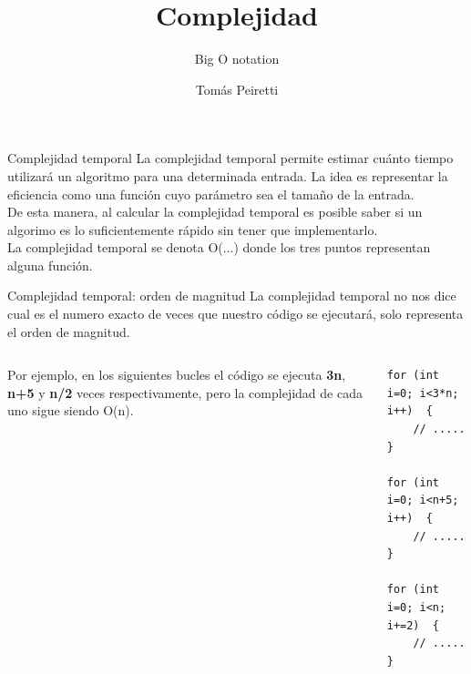 \documentclass[12pt]{beamer}
\title{Complejidad}
\subtitle{Big O notation}
\author{Tomás Peiretti}
\date{}
\begin{document}
\maketitle

\begin{frame}{Complejidad temporal}
    La \alert{complejidad temporal} permite estimar cuánto tiempo utilizará un algoritmo para una determinada entrada. La idea es representar la \alert{eficiencia} como una función cuyo parámetro sea el tamaño de la entrada. \\
    \medskip
    De esta manera, al calcular la complejidad temporal es posible \alert{saber si un algorimo es lo suficientemente rápido} sin tener que implementarlo. \\
    \medskip
    La complejidad temporal se denota \alert{O(...)} donde los tres puntos representan alguna función.
\end{frame}

\begin{frame}[fragile]{Complejidad temporal: orden de magnitud}
    La complejidad temporal no nos dice cual es el numero exacto de veces que nuestro código se ejecutará, solo representa el orden de magnitud. \\
    \medskip
    \begin{columns}
        Por ejemplo, en los siguientes bucles el código se ejecuta \textbf{3n}, \textbf{n+5} y \textbf{n/2} veces respectivamente, pero la complejidad de cada uno sigue siendo \alert{O(n)}.
        \begin{lstlisting}[basicstyle=\tiny]
for (int i=0; i<3*n; i++)  {
    // .....
} 

for (int i=0; i<n+5; i++)  {
    // .....
}

for (int i=0; i<n; i+=2)  {
    // .....
}
\end{lstlisting}
    \end{columns}
\end{frame}
\end{document}
